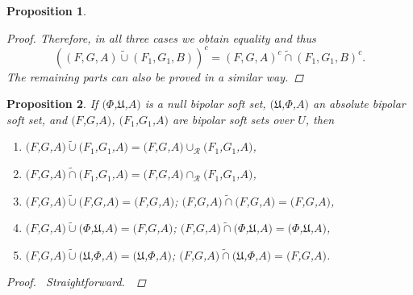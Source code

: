 \documentclass{amsart}
\theoremstyle{plain}
\newtheorem{proposition}{Proposition}
\numberwithin{equation}{section}
\begin{document}
\begin{proposition}
\begin{proof}
Therefore, in all three cases we obtain equality and thus 
\begin{equation*}
((F,G,A)\tilde{\cup}(F_{1},G_{1},B))^{c}=(F,G,A)^{c}\tilde{\cap}(F_{1},G_{1},B)^{c}\text{.}
\end{equation*}The remaining parts can also be proved in a similar way.
\end{proof}
\end{proposition}

\begin{proposition}
If $(\Phi $,$\mathfrak{U}$,$A)$ is a null \textit{bipolar} soft set, $(\mathfrak{U}$,$\Phi $,$A)$ an absolute \textit{bipolar} soft set, and $(F$,$G $,$A)$, $(F_{1}$,$G_{1}$,$A)$ are \textit{bipolar} soft sets over $U$, then

\begin{enumerate}
\item $(F$,$G$,$A)\tilde{\cup}(F_{1}$,$G_{1}$,$A)=(F$,$G$,$A)\cup _{\mathcal{R}}(F_{1}$,$G_{1}$,$A)$,

\item $(F$,$G$,$A)\tilde{\cap}(F_{1}$,$G_{1}$,$A)=(F$,$G$,$A)\cap _{\mathcal{R}}(F_{1}$,$G_{1}$,$A)$,

\item $(F$,$G$,$A)\tilde{\cup}(F$,$G$,$A)=(F$,$G$,$A)$; $(F$,$G$,$A)\tilde{\cap}(F$,$G$,$A)=(F$,$G$,$A)$,

\item $(F$,$G$,$A)\tilde{\cup}(\Phi $,$\mathfrak{U}$,$A)=(F$,$G$,$A)$; $(F$,$G$,$A)\tilde{\cap}(\Phi $,$\mathfrak{U}$,$A)=(\Phi $,$\mathfrak{U}$,$A)$,

\item $(F$,$G$,$A)\tilde{\cup}(\mathfrak{U}$,$\Phi $,$A)=(\mathfrak{U}$,$\Phi $,$A)$; $(F$,$G$,$A)\tilde{\cap}(\mathfrak{U}$,$\Phi $,$A)=(F$,$G$,$A)$.
\end{enumerate}

\begin{proof}
\ Straightforward.\ 
\end{proof}
\end{proposition}
\end{document}
